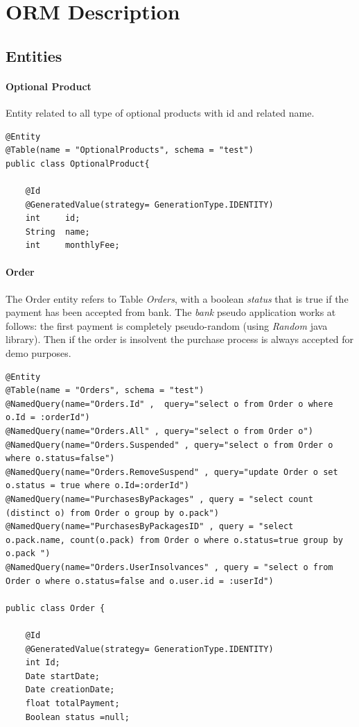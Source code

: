 \documentclass{article}
\begin{document}
\newpage

\section{ORM Description}

\subsection{Entities}
\lstset{language=Java}
\paragraph{Optional Product}
Entity related to all type of optional products with id and related name.
\begin{lstlisting}
@Entity
@Table(name = "OptionalProducts", schema = "test")
public class OptionalProduct{

    @Id
    @GeneratedValue(strategy= GenerationType.IDENTITY)
    int     id;
    String  name;
    int     monthlyFee;
\end{lstlisting}

\paragraph{Order}
The Order entity refers to Table \emph{Orders}, with a boolean \emph{status} that is true if the payment has been accepted from bank. The \emph{bank} pseudo application works at follows: the first payment is completely pseudo-random (using \emph{Random} java library). Then if the order is insolvent the purchase process is always accepted for demo purposes.
\begin{lstlisting}
@Entity
@Table(name = "Orders", schema = "test")
@NamedQuery(name="Orders.Id" ,  query="select o from Order o where o.Id = :orderId")
@NamedQuery(name="Orders.All" , query="select o from Order o") @NamedQuery(name="Orders.Suspended" , query="select o from Order o where o.status=false")
@NamedQuery(name="Orders.RemoveSuspend" , query="update Order o set o.status = true where o.Id=:orderId")
@NamedQuery(name="PurchasesByPackages" , query = "select count (distinct o) from Order o group by o.pack")
@NamedQuery(name="PurchasesByPackagesID" , query = "select  o.pack.name, count(o.pack) from Order o where o.status=true group by o.pack ")
@NamedQuery(name="Orders.UserInsolvances" , query = "select o from Order o where o.status=false and o.user.id = :userId")

public class Order {

    @Id
    @GeneratedValue(strategy= GenerationType.IDENTITY)
    int Id;
    Date startDate;
    Date creationDate;
    float totalPayment;
    Boolean status =null;
    
\end{lstlisting}
\end{document}
